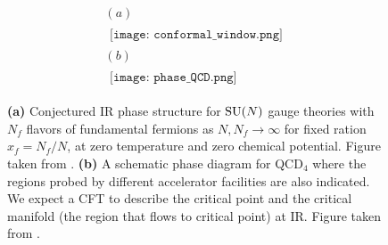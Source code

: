 \begin{figure}
	\centering 
	\begin{gather*}
		(a)\\\begin{aligned}\texttt{[image: conformal\_window.png]}
		\end{aligned}\\[.2in](b)\\\begin{aligned}\texttt{[image: phase\_QCD.png]}\end{aligned}
	\end{gather*}
	\caption[Conformal symmetry in gauge theories]{\label{fig: conformal_gauge} \textbf{(a)} Conjectured IR phase structure for $\mathrm{SU}(N)$ gauge theories with $N_f$ flavors of fundamental fermions as $N,N_f\rightarrow\infty$ for fixed ration $x_f=N_f/N$, at zero temperature and zero chemical potential.  Figure taken from \cite{Lee:2020ihn}. \textbf{(b)} A schematic phase diagram for QCD$_4$ where the regions probed by different accelerator facilities are also indicated. We expect a CFT to describe the critical point and the critical manifold (the region that flows to critical point) at IR. Figure taken from \cite{Nayak:2020bjz}.}
\end{figure}
